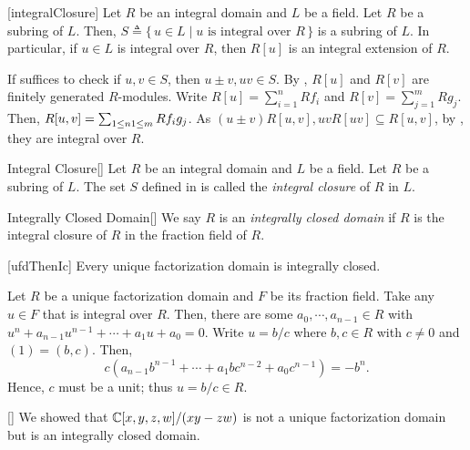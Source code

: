 \documentclass[../modern_algebra_2.tex]{subfiles}
\begin{document}
\begin{Corollary}{}[integralClosure]
    Let \(R\) be an integral domain and \(L\) be a field.
    Let \(R\) be a subring of \(L\).
    Then, \(S \triangleq \{\,u \in L \mid u\text{ is integral over }R\,\}\)
    is a subring of \(L\).
    In particular, if \(u \in L\) is integral over \(R\),
    then \(R[u]\) is an integral extension of \(R\).
\end{Corollary}
\begin{myproof}[Proof]
    If suffices to check if \(u, v \in S\), then \(u \pm v, uv \in S\).
    By , \(R[u]\) and \(R[v]\) are finitely generated \(R\)-modules.
    Write \(R[u] = \sum_{i=1}^{n} Rf_i\) and \(R[v] = \sum_{j=1}^{m} Rg_j\).
    Then, \(R[u,v] = \sum_{1 \le n\\ 1 \le m} R f_ig_j\).
    As \((u \pm v)R[u, v], uvR[uv] \subseteq R[u,v]\), by ,
    they are integral over \(R\).
\end{myproof}

\begin{Definition}{Integral Closure}[]
    Let \(R\) be an integral domain and \(L\) be a field.
    Let \(R\) be a subring of \(L\).
    The set \(S\) defined in 
    is called the \textit{integral closure} of \(R\) in \(L\).
\end{Definition}

\begin{Definition}{Integrally Closed Domain}[]
    We say \(R\) is an \emph{integrally closed domain}
    if \(R\) is the integral closure of \(R\) in the fraction field of \(R\).
\end{Definition}

\begin{Theorem}{}[ufdThenIc]
    Every unique factorization domain is integrally closed.
\end{Theorem}
\begin{myproof}[Proof]
    Let \(R\) be a unique factorization domain and \(F\) be its fraction field.
    Take any \(u \in F\) that is integral over \(R\).
    Then, there are some \(a_0, \cdots, a_{n-1} \in R\) with \(u^n + a_{n-1}u^{n-1} + \cdots + a_1u + a_0
    = 0\). Write \(u = b/c\) where \(b,c \in R\) with \(c \neq 0\) and \((1) = (b, c)\). Then,
    \[
        c(a_{n-1}b^{n-1} + \cdots + a_1bc^{n-2} + a_0c^{n-1}) = -b^n\text{.}
    \]
    Hence, \(c\) must be a unit; thus \(u = b/c \in R\).
\end{myproof}

\begin{Example}{}[]
    We showed that \(\CC{}[x,y,z,w]/(xy-zw)\) is not a unique factorization domain
    but is an integrally closed domain.
\end{Example}
\end{document}
